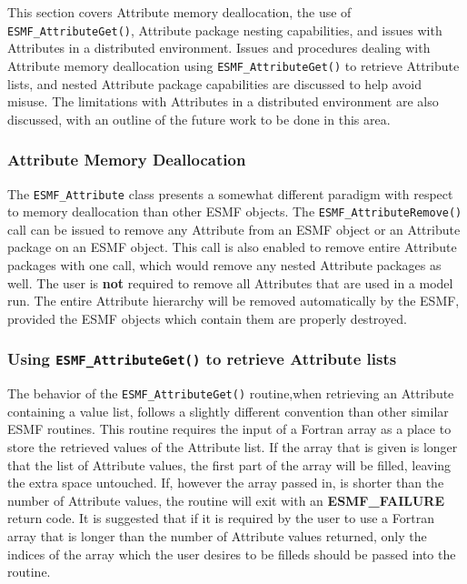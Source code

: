 %

This section covers Attribute memory deallocation, the use of {\tt ESMF\_AttributeGet()}, Attribute package nesting capabilities, and issues with Attributes in a distributed environment.  Issues and procedures dealing with Attribute memory deallocation using {\tt ESMF\_AttributeGet()} to retrieve Attribute lists, and nested Attribute package capabilities are discussed to help avoid misuse.  The limitations with Attributes in a distributed environment are also discussed, with an outline of the future work to be done in this area. 

\subsubsection{Attribute Memory Deallocation}

The {\tt ESMF\_Attribute} class presents a somewhat different paradigm with respect to memory deallocation than other ESMF objects.  The {\tt ESMF\_AttributeRemove()} call can be issued to remove any Attribute from an ESMF object or an Attribute package on an ESMF object.  This call is also enabled to remove entire Attribute packages with one call, which would remove any nested Attribute packages as well.  The user is {\bf not} required to remove all Attributes that are used in a model run.  The entire Attribute hierarchy will be removed automatically by the ESMF, provided the ESMF objects which contain them are properly destroyed.  

\subsubsection{Using {\tt ESMF\_AttributeGet()} to retrieve Attribute lists}

The behavior of the {\tt ESMF\_AttributeGet()} routine,when retrieving an Attribute containing a value list, follows a slightly different convention than other similar ESMF routines.  This routine requires the input of a Fortran array as a place to store the retrieved values of the Attribute list.  If the array that is given is longer that the list of Attribute values, the first part of the array will be filled, leaving the extra space untouched.  If, however the array passed in, is shorter than the number of Attribute values, the routine will exit with an {\bf ESMF\_FAILURE} return code.  It is suggested that if it is required by the user to use a Fortran array that is longer than the number of Attribute values returned, only the indices of the array which the user desires to be filleds should be passed into the routine.  
  
